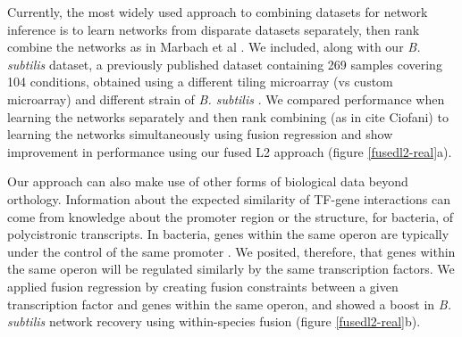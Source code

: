 \documentclass[11pt]{article}
\begin{document}
Currently, the most widely used approach to combining datasets for network inference is to learn networks from disparate datasets separately, then rank combine the networks as in Marbach et al \cite{marbach_revealing_2010}.
We included, along with our \textit{B. subtilis} dataset, a previously published dataset containing 269 samples covering 104 conditions, obtained using a different tiling microarray (vs custom microarray) and different strain of \textit{B. subtilis} \cite{nicolas2012condition}. 
We compared performance when learning the networks separately and then rank combining (as in cite Ciofani) to learning the networks simultaneously using fusion regression and show improvement in performance using our fused L2 approach (figure \ref{fusedl2-real}a). 

Our approach can also make use of other forms of biological data beyond orthology. Information about the expected similarity of TF-gene interactions can come from knowledge about the promoter region or the structure, for bacteria, of polycistronic transcripts. In bacteria, genes within the same operon are typically under the control of the same promoter \cite{lawrence_shared_2002}. We posited, therefore, that genes within the same operon will be regulated similarly by the same transcription factors. We applied fusion regression by creating fusion constraints between a given transcription factor and genes within the same operon, and showed a boost in \textit{B. subtilis} network recovery using within-species fusion (figure \ref{fusedl2-real}b). 
\end{document}
